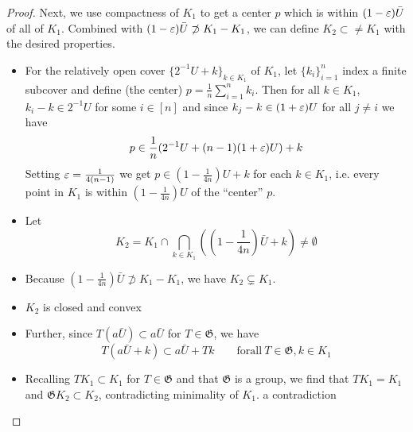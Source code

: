 \begin{proof}
  Next, we use compactness of $K_1$ to get a center $p$ which is within
  $(1 - \varepsilon) \bar{U}$ of all of $K_1$. Combined with
  $(1 - \varepsilon) \bar{U} \not\supset K_1 - K_1$, we can define
  $K_2 \subset\neq K_1$ with the desired properties.
  \begin{itemize}
    \item For the relatively open cover $\{2^{-1} U + k\}_{k \in K_1}$ of
      $K_1$, let $\{k_i\}_{i=1}^n$ index a finite subcover and define (the
      center)
      $p = \frac{1}{n} \sum_{i=1}^n k_i$.
      Then for all $k \in K_1$, $k_i - k \in 2^{-1} U$ for some $i \in [n]$ and
      since $k_j - k \in (1 + \varepsilon) U$ for all $j \neq i$ we have
      \[
        p \in \frac{1}{n} (2^{-1} U + (n-1) (1+\varepsilon) U) + k
      \]
      Setting $\varepsilon = \frac{1}{4(n-1)}$ we get $p \in (1 - \frac{1}{4n}) U + k$
      for each $k \in K_1$, i.e. every point in $K_1$ is within $(1 - \frac{1}{4 n} )U$
      of the ``center'' $p$.
    \item Let
      \[
        K_2 = K_1 \cap \bigcap_{k \in K_1} \left(
          \left(
            1 - \frac{1}{4n}
          \right) \bar{U} + k
        \right) \neq \emptyset
      \]
    \item Because $(1 - \frac{1}{4n} ) \bar{U} \not\supset K_1 - K_1$, we have
      $K_2 \subsetneq K_1$.
    \item $K_2$ is closed and convex
    \item Further, since $T(a \bar{U}) \subset a \bar{U}$ for $T \in
      \mathfrak{G}$, we have
      \[
        T(a\bar{U} + k)
        \subset a \bar{U} + T k
        \qquad \mathrm{for all}~T \in \mathfrak{G}, k \in K_1
      \]
    \item Recalling $T K_1 \subset K_1$ for $T \in \mathfrak{G}$
      and that $\mathfrak{G}$ is a group, we find that
      $T K_1 = K_1$ and $\mathfrak{G} K_2 \subset K_2$,
      contradicting minimality of $K_1$.
      a contradiction
  \end{itemize}
\end{proof}
